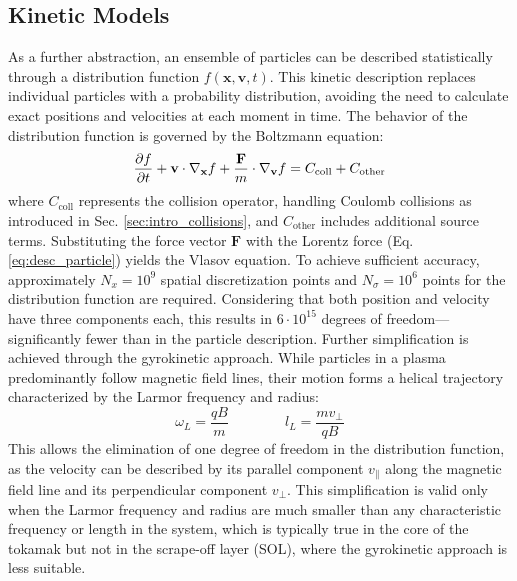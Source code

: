 \subsection{Kinetic Models}
\label{ssec:desc_kineticModels}
As a further abstraction, an ensemble of particles can be described statistically through a distribution function $f(\mathbf{x}, \mathbf{v},t)$. This kinetic description replaces individual particles with a probability distribution, avoiding the need to calculate exact positions and velocities at each moment in time. The behavior of the distribution function is governed by the Boltzmann equation:
\begin{equation}
	\label{eq:BoltzmannEquationKineticDescription}
	\pdv{f}{t} + \mathbf{v} \cdot \nabla_{\mathbf{x}} f + \frac{\mathbf{F}}{m} \cdot \nabla_{\mathbf{v}} f = C_{\text{coll}} + C_{\text{other}}
\end{equation}
where $C_{\text{coll}}$ represents the collision operator, handling Coulomb collisions as introduced in Sec. \ref{sec:intro_collisions}, and $C_{\text{other}}$ includes additional source terms. Substituting the force vector $\mathbf{F}$ with the Lorentz force (Eq. \ref{eq:desc_particle}) yields the Vlasov equation. \newline
To achieve sufficient accuracy, approximately $N_x = 10^9$ spatial discretization points and $N_\sigma = 10^6$ points for the distribution function are required. Considering that both position and velocity have three components each, this results in $6 \cdot 10^{15}$ degrees of freedom—significantly fewer than in the particle description. \newline
Further simplification is achieved through the gyrokinetic approach. While particles in a plasma predominantly follow magnetic field lines, their motion forms a helical trajectory characterized by the Larmor frequency and radius:
\begin{equation}
	\omega_L = \frac{qB}{m} \qquad\qquad l_L = \frac{mv_\perp}{qB}
\end{equation}
This allows the elimination of one degree of freedom in the distribution function, as the velocity can be described by its parallel component $v_\parallel$ along the magnetic field line and its perpendicular component $v_\perp$. This simplification is valid only when the Larmor frequency and radius are much smaller than any characteristic frequency or length in the system, which is typically true in the core of the tokamak but not in the scrape-off layer (SOL), where the gyrokinetic approach is less suitable.


